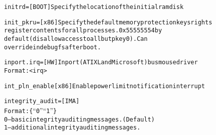 \documentclass[a4paper,8pt,english]{sphinxmanual}
\begin{document}
\begin{alltt}
        initrd=         {[}BOOT{]} Specify the location of the initial ramdisk

        init\_pkru=      {[}x86{]} Specify the default memory protection keys rights
                        register contents for all processes.  0x55555554 by
                        default (disallow access to all but pkey 0).  Can
                        override in debugfs after boot.

        inport.irq=     {[}HW{]} Inport (ATI XL and Microsoft) busmouse driver
                        Format: \textless{}irq\textgreater{}

        int\_pln\_enable  {[}x86{]} Enable power limit notification interrupt

        integrity\_audit={[}IMA{]}
                        Format: \{ ``0'' \textbar{} ``1'' \}
                        0 -- basic integrity auditing messages. (Default)
                        1 -- additional integrity auditing messages.


\end{alltt}
\end{document}

